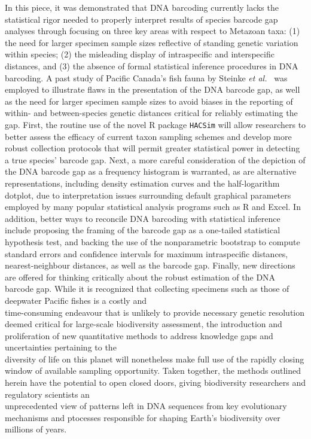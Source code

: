 In this piece, it was demonstrated that DNA barcoding currently lacks the \\ statistical rigor needed to properly interpret results of species barcode gap analyses through focusing on three key areas with respect to Metazoan taxa: (1) the need for larger specimen sample sizes reflective of standing genetic variation within species; (2) the misleading display of intraspecific and interspecific distances, and (3) the absence of formal statistical inference procedures in DNA barcoding. A past study of Pacific Canada's fish fauna by Steinke \textit{et al.}~ \cite{steinke2009dna} was employed to illustrate flaws in the presentation of the DNA barcode gap, as well as the need for larger specimen sample sizes to avoid biases in the reporting of within- and between-species genetic distances critical for reliably estimating the gap. First, the routine use of the novel R package {\tt HACSim} will allow researchers to better assess the efficacy of current taxon sampling schemes and develop more robust collection protocols that will permit greater statistical power in detecting a true species' barcode gap. Next, a more careful consideration of the depiction of the DNA barcode gap as a frequency histogram is warranted, as are alternative representations, including density estimation curves and the half-logarithm dotplot, due to interpretation issues surrounding default graphical parameters employed by many popular statistical analysis programs such as R and Excel. In addition, better ways to reconcile DNA barcoding with statistical inference include proposing the framing of the barcode gap as a one-tailed statistical \\ hypothesis test, and backing the use of the nonparametric bootstrap to compute standard errors and confidence intervals for maximum intraspecific distances, nearest-neighbour distances, as well as the barcode gap. Finally, new directions are offered for thinking critically about the robust estimation of the DNA barcode gap. While it is recognized that collecting specimens such as those of deepwater Pacific fishes is a costly and \\ time-consuming endeavour that is unlikely to provide necessary genetic resolution deemed critical for large-scale biodiversity assessment, the introduction and proliferation of new quantitative methods to address knowledge gaps and uncertainties pertaining to the \\ diversity of life on this planet will nonetheless make full use of the rapidly closing window of available sampling opportunity. Taken together, the methods outlined herein have the potential to open closed doors, giving biodiversity researchers and regulatory scientists an \\ unprecedented view of patterns left in DNA sequences from key evolutionary mechanisms and ptocesses responsible for shaping Earth's biodiversity over millions of years.



